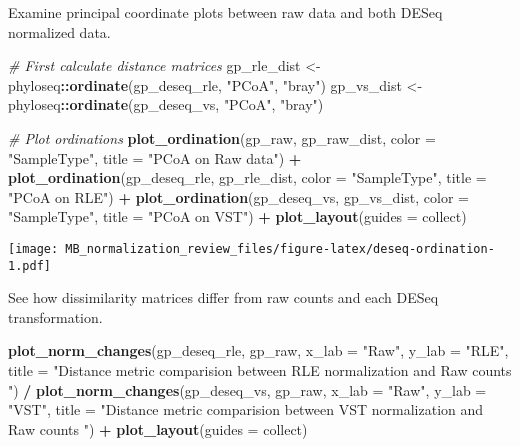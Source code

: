 \documentclass[
]{book}
\newenvironment{Shaded}{\begin{snugshade}}{\end{snugshade}}
\newcommand{\CommentTok}[1]{\textcolor[rgb]{0.56,0.35,0.01}{\textit{#1}}}
\newcommand{\DataTypeTok}[1]{\textcolor[rgb]{0.13,0.29,0.53}{#1}}
\newcommand{\KeywordTok}[1]{\textcolor[rgb]{0.13,0.29,0.53}{\textbf{#1}}}
\newcommand{\NormalTok}[1]{#1}
\newcommand{\OperatorTok}[1]{\textcolor[rgb]{0.81,0.36,0.00}{\textbf{#1}}}
\newcommand{\StringTok}[1]{\textcolor[rgb]{0.31,0.60,0.02}{#1}}
\begin{document}
Examine principal coordinate plots between raw data and both DESeq normalized data.

\begin{Shaded}
\begin{Highlighting}[]
\CommentTok{\# First calculate distance matrices }
\NormalTok{gp\_rle\_dist \textless{}{-}}\StringTok{ }\NormalTok{phyloseq}\OperatorTok{::}\KeywordTok{ordinate}\NormalTok{(gp\_deseq\_rle, }\StringTok{"PCoA"}\NormalTok{, }\StringTok{"bray"}\NormalTok{) }
\NormalTok{gp\_vs\_dist \textless{}{-}}\StringTok{ }\NormalTok{phyloseq}\OperatorTok{::}\KeywordTok{ordinate}\NormalTok{(gp\_deseq\_vs, }\StringTok{"PCoA"}\NormalTok{, }\StringTok{"bray"}\NormalTok{) }

\CommentTok{\# Plot ordinations}
\KeywordTok{plot\_ordination}\NormalTok{(gp\_raw, gp\_raw\_dist, }\DataTypeTok{color =} \StringTok{"SampleType"}\NormalTok{, }\DataTypeTok{title =} \StringTok{"PCoA on Raw data"}\NormalTok{) }\OperatorTok{+}\StringTok{ }
\KeywordTok{plot\_ordination}\NormalTok{(gp\_deseq\_rle, gp\_rle\_dist, }\DataTypeTok{color =} \StringTok{"SampleType"}\NormalTok{, }\DataTypeTok{title =} \StringTok{"PCoA on RLE"}\NormalTok{) }\OperatorTok{+}
\KeywordTok{plot\_ordination}\NormalTok{(gp\_deseq\_vs, gp\_vs\_dist, }\DataTypeTok{color =} \StringTok{"SampleType"}\NormalTok{, }\DataTypeTok{title =} \StringTok{"PCoA on VST"}\NormalTok{) }\OperatorTok{+}\StringTok{ }
\StringTok{  }\KeywordTok{plot\_layout}\NormalTok{(}\DataTypeTok{guides =} \StringTok{\textquotesingle{}collect\textquotesingle{}}\NormalTok{)}
\end{Highlighting}
\end{Shaded}

\texttt{[image: MB\_normalization\_review\_files/figure-latex/deseq-ordination-1.pdf]}

See how dissimilarity matrices differ from raw counts and each DESeq transformation.

\begin{Shaded}
\begin{Highlighting}[]
\KeywordTok{plot\_norm\_changes}\NormalTok{(gp\_deseq\_rle, gp\_raw, }
                  \DataTypeTok{x\_lab =} \StringTok{"Raw"}\NormalTok{, }\DataTypeTok{y\_lab =} \StringTok{"RLE"}\NormalTok{, }
                  \DataTypeTok{title =} \StringTok{"Distance metric comparision between RLE normalization and Raw counts "}\NormalTok{) }\OperatorTok{/}\StringTok{ }
\KeywordTok{plot\_norm\_changes}\NormalTok{(gp\_deseq\_vs, gp\_raw, }
                  \DataTypeTok{x\_lab =} \StringTok{"Raw"}\NormalTok{, }\DataTypeTok{y\_lab =} \StringTok{"VST"}\NormalTok{, }
                  \DataTypeTok{title =} \StringTok{"Distance metric comparision between VST normalization and Raw counts "}\NormalTok{) }\OperatorTok{+}\StringTok{ }
\StringTok{  }\KeywordTok{plot\_layout}\NormalTok{(}\DataTypeTok{guides =} \StringTok{\textquotesingle{}collect\textquotesingle{}}\NormalTok{)}
\end{Highlighting}
\end{Shaded}
\end{document}
